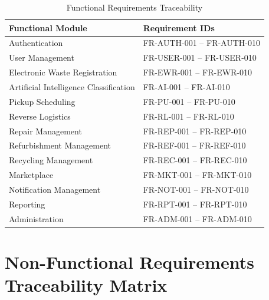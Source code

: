 \begin{table}[H]
\centering
\caption{Functional Requirements Traceability}
\label{tab:functional_traceability}

\begin{tabular}{|p{6cm}|p{5cm}|}

\hline
\textbf{Functional Module} &
\textbf{Requirement IDs} \\
\hline

Authentication &
FR-AUTH-001 -- FR-AUTH-010 \\
\hline

User Management &
FR-USER-001 -- FR-USER-010 \\
\hline

Electronic Waste Registration &
FR-EWR-001 -- FR-EWR-010 \\
\hline

Artificial Intelligence Classification &
FR-AI-001 -- FR-AI-010 \\
\hline

Pickup Scheduling &
FR-PU-001 -- FR-PU-010 \\
\hline

Reverse Logistics &
FR-RL-001 -- FR-RL-010 \\
\hline

Repair Management &
FR-REP-001 -- FR-REP-010 \\
\hline

Refurbishment Management &
FR-REF-001 -- FR-REF-010 \\
\hline

Recycling Management &
FR-REC-001 -- FR-REC-010 \\
\hline

Marketplace &
FR-MKT-001 -- FR-MKT-010 \\
\hline

Notification Management &
FR-NOT-001 -- FR-NOT-010 \\
\hline

Reporting &
FR-RPT-001 -- FR-RPT-010 \\
\hline

Administration &
FR-ADM-001 -- FR-ADM-010 \\
\hline

\end{tabular}

\end{table}

\section{Non-Functional Requirements Traceability Matrix}


